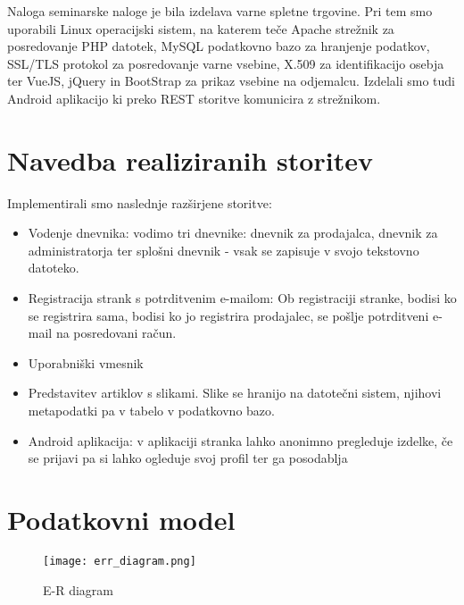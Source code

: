 \documentclass[a4paper,12pt]{report}
\begin{document}
Naloga seminarske naloge je bila izdelava varne spletne trgovine. Pri tem smo uporabili Linux operacijski sistem, na katerem teče Apache strežnik za posredovanje PHP datotek, MySQL podatkovno bazo za hranjenje podatkov, SSL/TLS protokol za posredovanje varne vsebine, X.509 za identifikacijo osebja ter VueJS, jQuery in BootStrap za prikaz vsebine na odjemalcu. Izdelali smo tudi Android aplikacijo ki preko REST storitve komunicira z strežnikom.


\chapter{Navedba realiziranih storitev}

Implementirali smo naslednje razširjene storitve:

\begin{itemize}  
\item Vodenje dnevnika: vodimo tri dnevnike: dnevnik za prodajalca, dnevnik za administratorja ter splošni dnevnik - vsak se zapisuje v svojo tekstovno datoteko.
\item Registracija strank s potrditvenim e-mailom: Ob registraciji stranke, bodisi ko se registrira sama, bodisi ko jo registrira prodajalec, se pošlje potrditveni e-mail na posredovani račun.
\item Uporabniški vmesnik
\item Predstavitev artiklov s slikami. Slike se hranijo na datotečni sistem, njihovi metapodatki pa v tabelo v podatkovno bazo.
\item Android aplikacija: v aplikaciji stranka lahko anonimno pregleduje izdelke, če se prijavi pa si lahko ogleduje svoj profil ter ga posodablja
\end{itemize}



\chapter{Podatkovni model}

\begin{figure}[htbp]
\begin{center}
\texttt{[image: err\_diagram.png]}
\caption{E-R diagram}
\label{Tekstovni dendrogram}
\end{center}
\end{figure}
\end{document}
